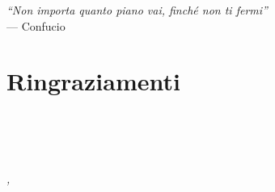 \cleardoublepage
{}
{}

\begin{flushright}{
    \slshape
    ``Non importa quanto piano vai, finché non ti fermi''} \\
    \medskip
    --- Confucio
\end{flushright}


\bigskip

\begingroup
\let\clearpage\relax
\let\cleardoublepage\relax
\let\cleardoublepage\relax

\chapter*{Ringraziamenti}

\noindent \textit{
    }\\

\noindent \textit{
    }\\

\noindent \textit{
    }\\
\bigskip

\noindent\textit{\myLocation, \myTime}
\hfill \myName

\endgroup
